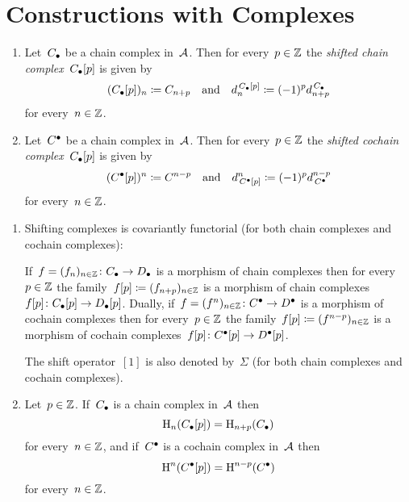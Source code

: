 \section{Constructions with Complexes}


\begin{definition}
  \leavevmode
  \begin{enumerate}
    \item
      Let~$C_\bullet$ be a chain complex in~$\mathcal{A}$.
      Then for every~$p \in \mathbb{Z}$ the \emph{shifted chain complex}~$C_\bullet[p]$ is given by
      \[
                  (C_\bullet[p])_n
        \coloneqq  C_{n+p}
        \quad\text{and}\quad
                  d^{\,C_\bullet[p]}_n
        \coloneqq  (-1)^p d^{\,C_\bullet}_{n+p}
      \]
      for every~$n \in \mathbb{Z}$.
    \item
      Let~$C^\bullet$ be a chain complex in~$\mathcal{A}$.
      Then for every~$p \in \mathbb{Z}$ the \emph{shifted cochain complex}~$C_\bullet[p]$ is given by
      \[
                  (C^\bullet[p])^n
        \coloneqq  C^{n-p}
        \quad\text{and}\quad
                  d_{\,C^\bullet[p]}^n
        \coloneqq  (-1)^p d_{\,C^\bullet}^{n-p}
      \]
      for every~$n \in \mathbb{Z}$.
  \end{enumerate}
\end{definition}


\begin{remark}
  \leavevmode
  \begin{enumerate}
    \item
      Shifting complexes is covariantly functorial (for both chain complexes and cochain complexes):
      
      If~$f = (f_n)_{n \in \mathbb{Z}} \colon C_\bullet \to D_\bullet$ is a morphism of chain complexes then for every~$p \in \mathbb{Z}$ the family~$f[p] \coloneqq (f_{n+p})_{n \in \mathbb{Z}}$ is a morphism of chain complexes~$f[p] \colon C_\bullet[p] \to D_\bullet[p]$.
      Dually, if~$f = (f^n)_{n \in \mathbb{Z}} \colon C^\bullet \to D^\bullet$ is a morphism of cochain complexes then for every~$p \in \mathbb{Z}$ the family~$f[p] \coloneqq (f^{n-p})_{n \in \mathbb{Z}}$ is a morphism of cochain complexes~$f[p] \colon C^\bullet[p] \to D^\bullet[p]$.
      
      The shift operator~$[1]$ is also denoted by~$\Sigma$ (for both chain complexes and cochain complexes).
    \item
      Let~$p \in \mathbb{Z}$.
      If~$C_\bullet$ is a chain complex in~$\mathcal{A}$ then
      \[
          \operatorname{H}_n(C_\bullet[p])
        = \operatorname{H}_{n+p}(C_\bullet)
      \]
      for every~$n \in \mathbb{Z}$, and if~$C^\bullet$ is a cochain complex in~$\mathcal{A}$ then
      \[
          \operatorname{H}^n(C^\bullet[p])
        = \operatorname{H}^{n-p}(C^\bullet)
      \]
      for every~$n \in \mathbb{Z}$.
  \end{enumerate}
\end{remark}


